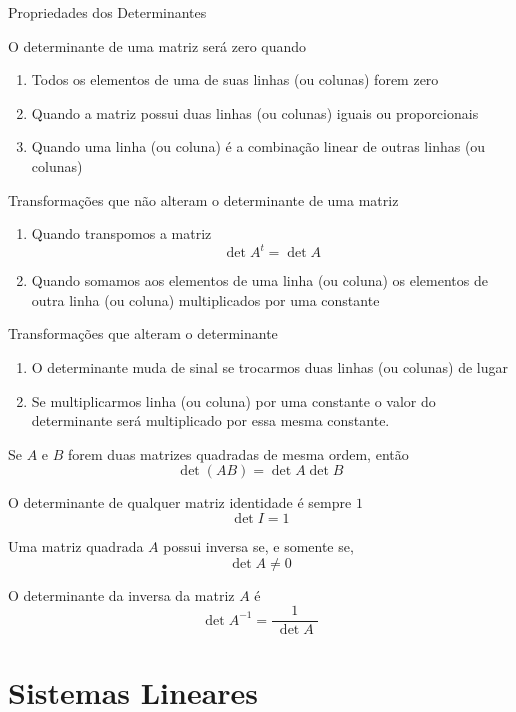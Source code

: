 \begin{teoria}{Propriedades dos Determinantes}
    
    O determinante de uma matriz será zero quando
    \begin{enumerate}
        \item Todos os elementos de uma de suas linhas (ou colunas) forem zero
        \item Quando a matriz possui duas linhas (ou colunas) iguais ou proporcionais
        \item Quando uma linha (ou coluna) é a combinação linear de outras linhas (ou colunas)
    \end{enumerate}
    
    Transformações que não alteram o determinante de uma matriz
    \begin{enumerate}
        \item Quando transpomos a matriz \[\det A^t = \det A\]
        \item Quando somamos aos elementos de uma linha (ou coluna) os elementos de outra linha (ou coluna) multiplicados por uma constante
    \end{enumerate}
    
    Transformações que alteram o determinante
    \begin{enumerate}
        \item O determinante muda de sinal se trocarmos duas linhas (ou colunas) de lugar
        \item Se multiplicarmos linha (ou coluna) por uma constante o valor do determinante será multiplicado por essa mesma constante.
    \end{enumerate}
    
    Se $A$ e $B$ forem duas matrizes quadradas de mesma ordem, então
    \[ \det(AB) = \det A \det B \]
    
    O determinante de qualquer matriz identidade é sempre $1$
    \[ \det I = 1 \]
    
    Uma matriz quadrada $A$ possui inversa se, e somente se, 
    \[\det A\neq 0\]
    
    O determinante da inversa da matriz $A$ é
    \[ \det A^{-1} = \frac{1}{\;\det A\;} \]
    
\end{teoria}

\section{Sistemas Lineares}

